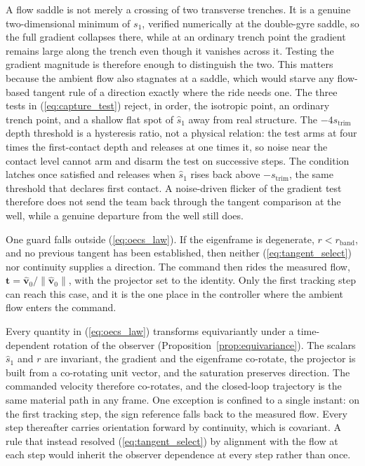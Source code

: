 \documentclass[lettersize,journal]{IEEEtran}
\begin{document}
A flow saddle is not merely a crossing of two transverse trenches. It is
a genuine two-dimensional minimum of $s_1$, verified numerically at the
double-gyre saddle, so the full gradient collapses there, while at an
ordinary trench point the gradient remains large along the trench even
though it vanishes across it. Testing the gradient magnitude is
therefore enough to distinguish the two. This matters because the
ambient flow also stagnates at a saddle, which would starve any
flow-based tangent rule of a direction exactly where the ride needs one.
The three tests in (\ref{eq:capture_test}) reject, in order, the
isotropic point, an ordinary trench point, and a shallow flat spot of
$\hat{s}_1$ away from real structure. The $-4s_{\mathrm{trim}}$ depth
threshold is a hysteresis ratio, not a physical relation: the test arms
at four times the first-contact depth and releases at one times it, so
noise near the contact level cannot arm and disarm the test on
successive steps. The condition latches once
satisfied and releases when $\hat{s}_1$ rises back above
$-s_{\mathrm{trim}}$, the same threshold that declares first contact. A
noise-driven flicker of the gradient test therefore does not send the
team back through the tangent comparison at the well, while a genuine
departure from the well still does.

One guard falls outside (\ref{eq:oecs_law}). If the eigenframe is
degenerate, $r < r_{\mathrm{band}}$, and no previous tangent has been
established, then neither (\ref{eq:tangent_select}) nor continuity
supplies a direction. The command then rides the measured flow,
$\mathbf{t} = \hat{\mathbf{v}}_0/\|\hat{\mathbf{v}}_0\|$, with the
projector set to the identity. Only the first tracking step can reach
this case, and it is the one place in the controller where the ambient
flow enters the command.

Every quantity in (\ref{eq:oecs_law}) transforms equivariantly under a
time-dependent rotation of the observer
(Proposition~\ref{prop:equivariance}). The scalars $\hat{s}_1$ and $r$
are invariant, the gradient and the eigenframe co-rotate, the projector
is built from a co-rotating unit vector, and the saturation preserves
direction. The commanded velocity therefore co-rotates, and the
closed-loop trajectory is the same material path in any frame. One
exception is confined to a single instant: on the first tracking step,
the sign reference falls back to the measured flow. Every step
thereafter carries orientation forward by continuity, which is
covariant. A rule that instead resolved (\ref{eq:tangent_select}) by
alignment with the flow at each step would inherit the observer
dependence at every step rather than once.
\end{document}
